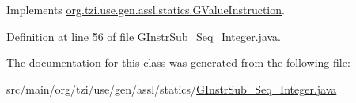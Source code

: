 Implements \hyperlink{interfaceorg_1_1tzi_1_1use_1_1gen_1_1assl_1_1statics_1_1_g_value_instruction_a8fb7e593c2822d29ca840961f1f19df3}{org.\-tzi.\-use.\-gen.\-assl.\-statics.\-G\-Value\-Instruction}.



Definition at line 56 of file G\-Instr\-Sub\-\_\-\-Seq\-\_\-\-Integer.\-java.



The documentation for this class was generated from the following file\-:\begin{DoxyCompactItemize}
\item 
src/main/org/tzi/use/gen/assl/statics/\hyperlink{_g_instr_sub___seq___integer_8java}{G\-Instr\-Sub\-\_\-\-Seq\-\_\-\-Integer.\-java}\end{DoxyCompactItemize}
